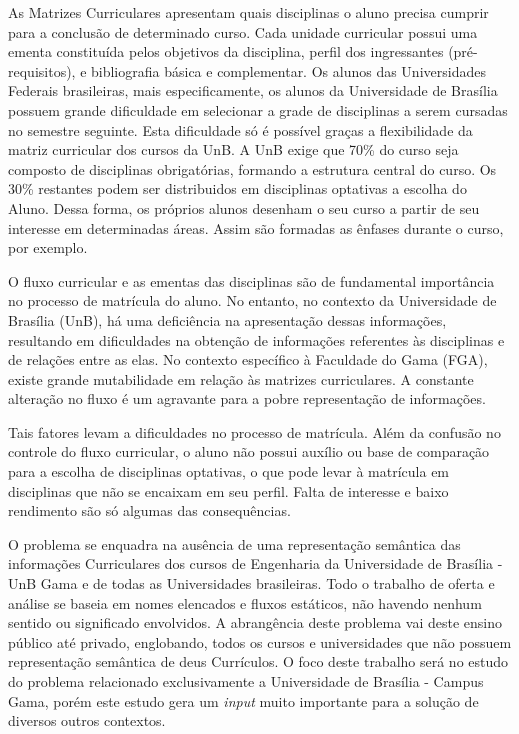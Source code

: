 
As Matrizes Curriculares apresentam quais disciplinas o aluno precisa cumprir para a conclusão de determinado curso. Cada unidade curricular possui uma ementa constituída pelos objetivos da disciplina, perfil dos ingressantes (pré-requisitos), e bibliografia básica e complementar. Os alunos das Universidades Federais brasileiras, mais especificamente, os alunos da Universidade de Brasília possuem grande dificuldade em selecionar a grade de disciplinas a serem cursadas no semestre seguinte. Esta dificuldade só é possível graças a flexibilidade da matriz curricular dos cursos da UnB. A UnB exige que 70\% do curso seja composto de disciplinas obrigatórias, formando a estrutura central do curso. Os 30\% restantes podem ser distribuidos em disciplinas optativas a escolha do Aluno. Dessa forma, os próprios alunos desenham o seu curso a partir de seu interesse em determinadas áreas. Assim são formadas as ênfases durante o curso, por exemplo.

O fluxo curricular e as ementas das disciplinas são de fundamental importância no processo de matrícula do aluno. No entanto, no contexto da Universidade de Brasília (UnB), há uma deficiência na apresentação dessas informações, resultando em dificuldades na obtenção de informações referentes às disciplinas e de relações entre as elas. No contexto específico à Faculdade do Gama (FGA), existe grande mutabilidade em relação às matrizes curriculares. A constante alteração no fluxo é um agravante para a pobre representação de informações. 

Tais fatores levam a dificuldades no processo de matrícula. Além da confusão no controle do fluxo curricular, o aluno não possui auxílio ou base de comparação para a escolha de disciplinas optativas, o que pode levar à matrícula em disciplinas que não se encaixam em seu perfil. Falta de interesse e baixo rendimento são só algumas das consequências.

O problema se enquadra na ausência de uma representação semântica das informações Curriculares dos cursos de Engenharia da Universidade de Brasília - UnB Gama e de todas as Universidades brasileiras. Todo o trabalho de oferta e análise se baseia em nomes elencados e fluxos estáticos, não havendo nenhum sentido ou significado envolvidos. A abrangência deste problema vai deste ensino público até privado, englobando, todos os cursos e universidades que não possuem representação semântica de deus Currículos. O foco deste trabalho será no estudo do problema relacionado exclusivamente a Universidade de Brasília - Campus Gama, porém este estudo gera um \textit{input} muito importante para a solução de diversos outros contextos. 

